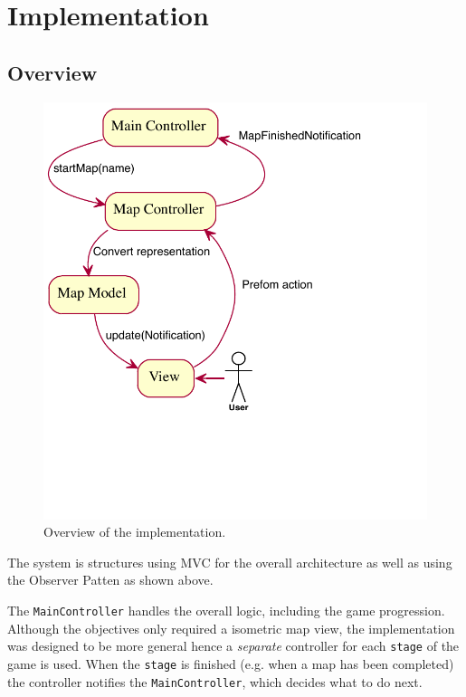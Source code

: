 
\section{Implementation}

\subsection{Overview}

\begin{figure}[htbp]
	\centering
		\includegraphics{figures/engine_exported.pdf}
	\caption{Overview of the implementation.}
	\label{fig:overview_engine}
\end{figure}

The system is structures using MVC for the overall architecture as well as  using the Observer Patten as shown above.

The \texttt{MainController} handles the overall logic, including the game progression. 
Although the objectives only required a isometric  map view, the implementation was designed to be more general  hence a \emph{separate} controller for each \texttt{stage} of the game is used. When the \texttt{stage} is finished  (e.g. when a map has been completed) the controller notifies the \texttt{MainController}, which decides what to do next.   

